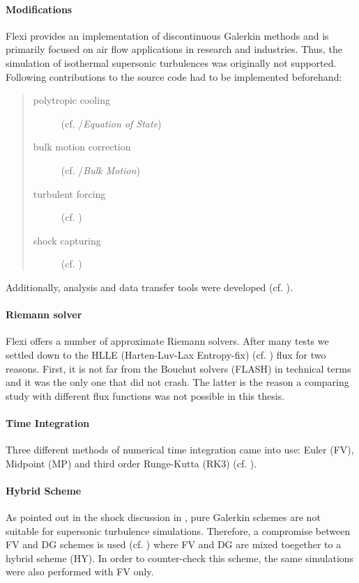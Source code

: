 \paragraph{Modifications}
Flexi provides an implementation of discontinuous Galerkin methods and is
primarily focused on air flow applications in research and industries. Thus,
the simulation of isothermal supersonic turbulences was originally not
supported.  Following contributions to the source code had to be implemented
beforehand:
\begin{quote}
\begin{description}
    \item [polytropic cooling] (cf. /\emph{Equation of State})
    \item [bulk motion correction] (cf. /\emph{Bulk Motion})
    \item [turbulent forcing] (cf. )
    \item [shock capturing] (cf. )
\end{description}
\end{quote}
Additionally, analysis and data transfer tools were developed (cf. ).

\paragraph{Riemann solver}
Flexi offers a number of approximate Riemann solvers. After many tests we
settled down to the HLLE (Harten-Luv-Lax Entropy-fix) (cf. \cite{balsara_2010})
flux for two reasons.  First, it is not far from the Bouchut solvers (FLASH) in
technical terms and it was the only one that did not crash. The latter is the
reason a comparing study with different flux functions was not possible in this
thesis.

\paragraph{Time Integration}
Three different methods of numerical time integration came into use: Euler (FV),
Midpoint (MP) and third order Runge-Kutta (RK3) (cf. ).

\paragraph{Hybrid Scheme}
As pointed out in the shock discussion in , pure Galerkin schemes
are not suitable for supersonic turbulence simulations. Therefore, a compromise
between FV and DG schemes is used (cf. ) where FV and DG
are mixed toegether to a hybrid scheme (HY). In order to counter-check this scheme,
the same simulations were also performed with FV only.

